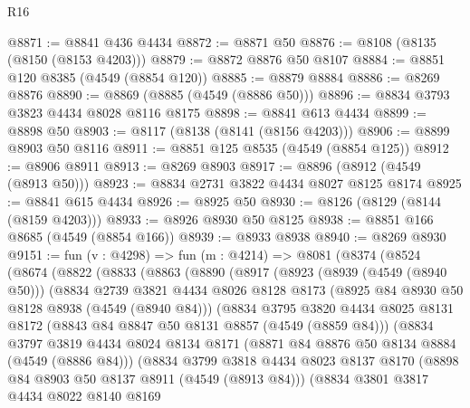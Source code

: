 \begin{lexlean}{R16}
\begin{coremodule}
@8871 := @8841 @436 @4434
@8872 := @8871 @50
@8876 := @8108 (@8135 (@8150 (@8153 @4203)))
@8879 := @8872 @8876 @50 @8107
@8884 := @8851 @120 @8385 (@4549 (@8854 @120))
@8885 := @8879 @8884
@8886 := @8269 @8876
@8890 := @8869 (@8885 (@4549 (@8886 @50)))
@8896 := @8834 @3793 @3823 @4434 @8028 @8116 @8175
@8898 := @8841 @613 @4434
@8899 := @8898 @50
@8903 := @8117 (@8138 (@8141 (@8156 @4203)))
@8906 := @8899 @8903 @50 @8116
@8911 := @8851 @125 @8535 (@4549 (@8854 @125))
@8912 := @8906 @8911
@8913 := @8269 @8903
@8917 := @8896 (@8912 (@4549 (@8913 @50)))
@8923 := @8834 @2731 @3822 @4434 @8027 @8125 @8174
@8925 := @8841 @615 @4434
@8926 := @8925 @50
@8930 := @8126 (@8129 (@8144 (@8159 @4203)))
@8933 := @8926 @8930 @50 @8125
@8938 := @8851 @166 @8685 (@4549 (@8854 @166))
@8939 := @8933 @8938
@8940 := @8269 @8930
@9151 := fun (v : @4298) =>
  fun (m : @4214) =>
  @8081
    (@8374
      (@8524
        (@8674
          (@8822
            (@8833
              (@8863
                (@8890
                  (@8917
                    (@8923
                      (@8939 (@4549 (@8940 @50)))
                      (@8834
                        @2739
                        @3821
                        @4434
                        @8026
                        @8128
                        @8173
                        (@8925 @84 @8930 @50 @8128 @8938 (@4549 (@8940 @84)))
                        (@8834
                          @3795
                          @3820
                          @4434
                          @8025
                          @8131
                          @8172
                          (@8843 @84 @8847 @50 @8131 @8857 (@4549 (@8859 @84)))
                          (@8834
                            @3797
                            @3819
                            @4434
                            @8024
                            @8134
                            @8171
                            (@8871 @84 @8876 @50 @8134 @8884 (@4549 (@8886 @84)))
                            (@8834
                              @3799
                              @3818
                              @4434
                              @8023
                              @8137
                              @8170
                              (@8898 @84 @8903 @50 @8137 @8911 (@4549 (@8913 @84)))
                              (@8834
                                @3801
                                @3817
                                @4434
                                @8022
                                @8140
                                @8169

\end{coremodule}
\end{lexlean}

